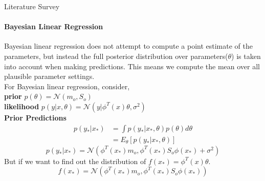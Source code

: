 \documentclass[handout,9pt]{beamer}
\numberwithin{theorem}{section}
\begin{document}
\begin{frame}{Literature Survey}
	\begin{spacing}{1}
		\framesubtitle{Bayesian Linear Regression}
		
		Bayesian linear regression does not attempt to compute a point estimate of the parameters, but instead the full posterior distribution over parameters($\theta$) is taken into account when making predictions. This means we compute the mean over all plausible parameter settings.\\\pause
		For Bayesian linear regression, consider,\\
		\textbf{prior} $p(\theta) = \mathcal{N}(m_o, S_o)$\\
		\textbf{likelihood} $p(y|x, \theta) = \mathcal{N}(y|\phi^T(x)\theta, \sigma^2)$\\\pause
		\vspace{0.2cm}
		\textbf{Prior Predictions}
		\begin{align*}
			p(y_*|x_*) &= \int p(y_*|x_*, \theta)p(\theta)d\theta\\
			&= E_\theta[p(y_*|x_*, \theta)]
		\end{align*}\pause
		\begin{equation*}
			p(y_*|x_*) = \mathcal{N}(\phi^T(x_*)m_o, \phi^T(x_*)S_o\phi(x_*) + \sigma^2)
		\end{equation*}\pause
		But if we want to find out the distribution of $f(x_*) = \phi^T(x)\theta$.
		\begin{equation*}
			f(x_*) = \mathcal{N}(\phi^T(x_*)m_o, \phi^T(x_*)S_o\phi(x_*))
		\end{equation*}
	\end{spacing}
\end{frame}
\end{document}
